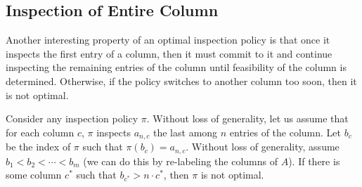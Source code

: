  \subsection{Inspection of Entire Column}
 Another interesting property of an optimal inspection policy is that once it inspects the first entry of a column, then it must commit to it and continue inspecting the remaining entries of the column until feasibility of the column is determined. Otherwise, if the policy switches to another column too soon, then it is not optimal. 
 \begin{theorem} \label{matrix:theorem:col_by_col_opt}
 Consider any inspection policy $\pi$.
 Without loss of generality, let us assume that for each column $c$, $\pi$ inspects $a_{n,c}$ the last among $n$ entries of the column. 
 Let $b_c$ be the index of $\pi$ such that $\pi(b_c) = a_{n,c}$. 
 Without loss of generality, assume $b_1 < b_2 < \cdots < b_m$ (we can do this by re-labeling the columns of $A$). 
 If there is some column $c^*$ such that $b_{c^*} > n\cdot c^*$, then $\pi$ is not optimal.
 \end{theorem}
